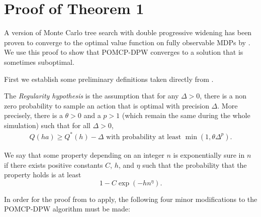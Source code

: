 \chapter{Proof of Theorem 1} \label{sec:proof}

A version of Monte Carlo tree search with double progressive widening has been proven to converge to the optimal value function on fully observable MDPs by \citet{auger2013continuous}.
We use this proof to show that POMCP-DPW converges to a solution that is sometimes suboptimal.

First we establish some preliminary definitions taken directly from \citet{auger2013continuous}.

\begin{definition}
    The \emph{Regularity hypothesis} is the assumption that for any $\Delta > 0$, there is a non zero probability to sample an action that is optimal with precision $\Delta$. More precisely, there is a $\theta > 0$ and a $p > 1$ (which remain the same during the whole simulation) such that for all $\Delta > 0$, 
\begin{align}
    Q(ha) \geq Q^*(h)-\Delta \text{ with probability at least } \min(1, \theta \Delta^p)\text{.}
\end{align}
\end{definition}

\begin{definition}
    We say that some property depending on an integer $n$ is exponentially sure in $n$ if there exists positive constants $C$, $h$, and $\eta$ such that the probability that the property holds is at least $$1-C \exp(-hn^\eta)\text{.}$$
\end{definition}

In order for the proof from \citet{auger2013continuous} to apply, the following four minor modifications to the POMCP-DPW algorithm must be made: 

